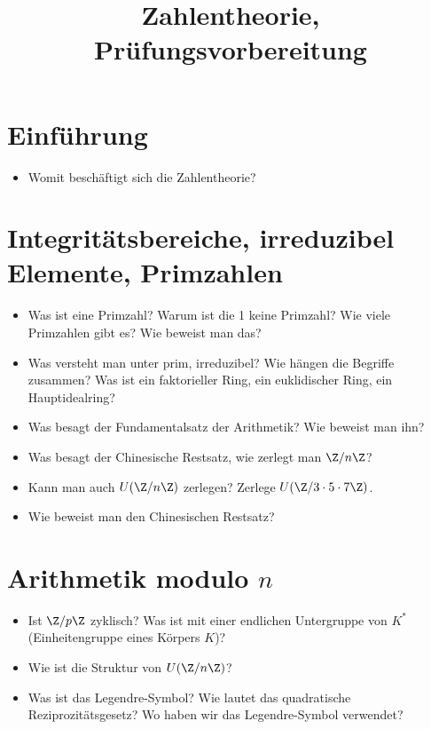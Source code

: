 \documentclass{scrartcl}
\title{Zahlentheorie, Prüfungsvorbereitung}
\author{}
\date{}
\begin{document}
\maketitle

\setcounter{section}{-1}
\section{Einführung}

\begin{itemize}
	\item
		Womit beschäftigt sich die Zahlentheorie?
\end{itemize}

\section{Integritätsbereiche, irreduzibel Elemente, Primzahlen}

\begin{itemize}
	\item
		Was ist eine Primzahl?
		Warum ist die 1 keine Primzahl?
		Wie viele Primzahlen gibt es?
		Wie beweist man das?
	\item
		Was versteht man unter prim, irreduzibel?
		Wie hängen die Begriffe zusammen?
		Was ist ein faktorieller Ring, ein euklidischer Ring, ein Hauptidealring?
	\item
		Was besagt der Fundamentalsatz der Arithmetik?
		Wie beweist man ihn?
	\item
		Was besagt der Chinesische Restsatz, wie zerlegt man $\Z/n\Z$?
	\item
		Kann man auch $U(\Z/n\Z)$ zerlegen?
		Zerlege $U(\Z / 3\cdot 5 \cdot 7 \Z)$.
	\item
		Wie beweist man den Chinesischen Restsatz?
\end{itemize}

\section{Arithmetik modulo $n$}

\begin{itemize}
	\item
		Ist $\Z/p\Z$ zyklisch?
		Was ist mit einer endlichen Untergruppe von $K^*$ (Einheitengruppe eines Körpers $K$)?
	\item
		Wie ist die Struktur von $U(\Z/n\Z)$?
	\item
		Was ist das Legendre-Symbol?
		Wie lautet das quadratische Reziprozitätsgesetz?
		Wo haben wir das Legendre-Symbol verwendet?
\end{itemize}
\end{document}
